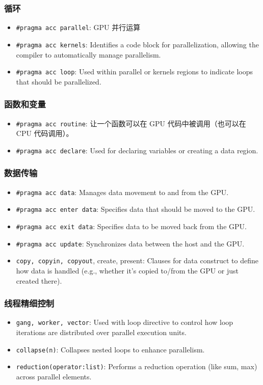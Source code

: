 \subsubsection{循环}
\begin{itemize}
\item \verb`#pragma acc parallel`: GPU 并行运算
\item \verb`#pragma acc kernels`: Identifies a code block for parallelization, allowing the compiler to automatically manage parallelism.
\item \verb`#pragma acc loop`: Used within parallel or kernels regions to indicate loops that should be parallelized.
\end{itemize}

\subsubsection{函数和变量}
\begin{itemize}
\item \verb`#pragma acc routine`: 让一个函数可以在 GPU 代码中被调用（也可以在 CPU 代码调用）。
\item \verb`#pragma acc declare`: Used for declaring variables or creating a data region.
\end{itemize}

\subsubsection{数据传输}
\begin{itemize}
\item \verb`#pragma acc data`: Manages data movement to and from the GPU.
\item \verb`#pragma acc enter data`: Specifies data that should be moved to the GPU.
\item \verb`#pragma acc exit data`: Specifies data to be moved back from the GPU.
\item \verb`#pragma acc update`: Synchronizes data between the host and the GPU.
\item \verb`copy, copyin, copyout`, create, present: Clauses for data construct to define how data is handled (e.g., whether it's copied to/from the GPU or just created there).
\end{itemize}

\subsubsection{线程精细控制}
\begin{itemize}
\item \verb`gang, worker, vector`: Used with loop directive to control how loop iterations are distributed over parallel execution units.
\item \verb`collapse(n)`: Collapses nested loops to enhance parallelism.
\item \verb`reduction(operator:list)`: Performs a reduction operation (like sum, max) across parallel elements.
\end{itemize}

